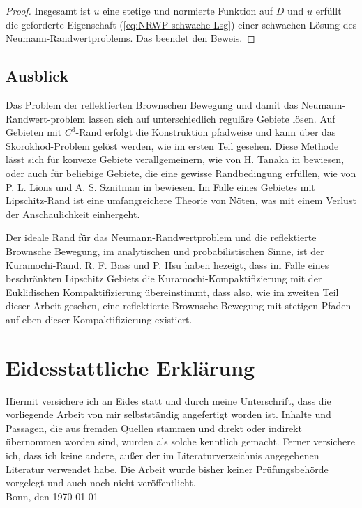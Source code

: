 \documentclass[10pt, a4paper, leqno, twoside, bibliography=totocnumbered, final]{scrartcl}
\theoremstyle{definition}
\theoremstyle{plain}%
\theoremstyle{remark}
\begin{document}
\begin{proof}
Insgesamt ist $ u $ eine stetige und normierte Funktion auf $ \overline{D} $ und $ u $ erfüllt die geforderte Eigenschaft (\ref{eq:NRWP-schwache-Lsg}) einer schwachen Lösung des Neumann-Randwertproblems. Das beendet den Beweis.

\end{proof}

\subsection{Ausblick}

Das Problem der reflektierten Brownschen Bewegung und damit das Neumann-Randwert-problem lassen sich auf unterschiedlich reguläre Gebiete lösen. Auf Gebieten mit $ C^3 $-Rand erfolgt die Konstruktion pfadweise und kann über das Skorokhod-Problem gelöst werden, wie im ersten Teil gesehen. Diese Methode lässt sich für konvexe Gebiete verallgemeinern, wie von H. Tanaka in \cite{Tanaka} bewiesen, oder auch für beliebige Gebiete, die eine gewisse Randbedingung erfüllen, wie von P. L. Lions und A. S. Sznitman in \cite{Lions-Sznitman} bewiesen. Im Falle eines Gebietes mit Lipschitz-Rand ist eine umfangreichere Theorie von Nöten, was mit einem Verlust der Anschaulichkeit einhergeht. 

Der ideale Rand für das Neumann-Randwertproblem und die reflektierte Brownsche Bewegung, im analytischen und probabilistischen Sinne, ist der Kuramochi-Rand. R. F. Bass und P. Hsu \cite{Bass-Hsu} haben hezeigt, dass im Falle eines beschränkten Lipschitz Gebiets die Kuramochi-Kompaktifizierung mit der Euklidischen Kompaktifizierung übereinstimmt, dass also, wie im zweiten Teil dieser Arbeit gesehen, eine reflektierte Brownsche Bewegung mit stetigen Pfaden auf eben dieser Kompaktifizierung existiert.

\newpage
\appendix





\newpage
\fancyhead{}
\mbox{}
\newpage

\vspace*{1cm}

\section{Eidesstattliche Erklärung}

Hiermit versichere ich an Eides statt und durch meine Unterschrift, dass die vorliegende Arbeit von mir selbstständig angefertigt worden ist. Inhalte und Passagen, die aus fremden Quellen stammen und direkt oder indirekt übernommen worden sind, wurden als solche kenntlich gemacht. Ferner versichere ich, dass ich keine andere, außer der im Literaturverzeichnis angegebenen Literatur verwendet habe. Die Arbeit wurde bisher keiner Prüfungsbehörde vorgelegt und auch noch nicht veröffentlicht.\\

Bonn, den \today 
\end{document}
